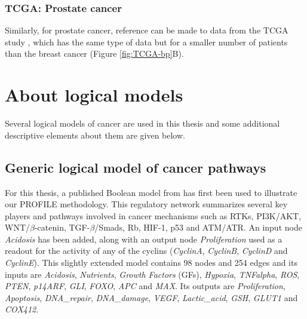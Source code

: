 \documentclass[a4paper,12pt,twoside,onecolumn,openright,final,oldfontcommands]{memoir}
\begin{document}
\subsection{TCGA: Prostate cancer}\label{appendix-prostate}

Similarly, for prostate cancer, reference can be made to data from the
TCGA study \citep{abeshouse2015molecular}, which has the same type of
data but for a smaller number of patients than the breast cancer (Figure
\ref{fig:TCGA-bp}B).

\chapter{About logical models}\label{about-logical-models}

Several logical models of cancer are used in this thesis and some
additional descriptive elements about them are given below.

\section{Generic logical model of cancer pathways}\label{appendix-fumia}

For this thesis, a published Boolean model from \citep{fumia2013boolean}
has first been used to illustrate our PROFILE methodology. This
regulatory network summarizes several key players and pathways involved
in cancer mechanisms such as RTKs, PI3K/AKT, WNT/\(\beta\)-catenin,
TGF-\(\beta\)/Smads, Rb, HIF-1, p53 and ATM/ATR. An input node
\emph{Acidosis} has been added, along with an output node
\emph{Proliferation} used as a readout for the activity of any of the
cyclins (\emph{CyclinA}, \emph{CyclinB}, \emph{CyclinD} and
\emph{CyclinE}). This slightly extended model contains 98 nodes and 254
edges and its inputs are \emph{Acidosis}, \emph{Nutrients}, \emph{Growth
Factors} (GFs), \emph{Hypoxia}, \emph{TNFalpha}, \emph{ROS},
\emph{PTEN}, \emph{p14ARF}, \emph{GLI}, \emph{FOXO}, \emph{APC} and
\emph{MAX}. Its outputs are \emph{Proliferation}, \emph{Apoptosis},
\emph{DNA\_repair}, \emph{DNA\_damage}, \emph{VEGF},
\emph{Lactic\_acid}, \emph{GSH}, \emph{GLUT1} and \emph{COX412}.
\end{document}
